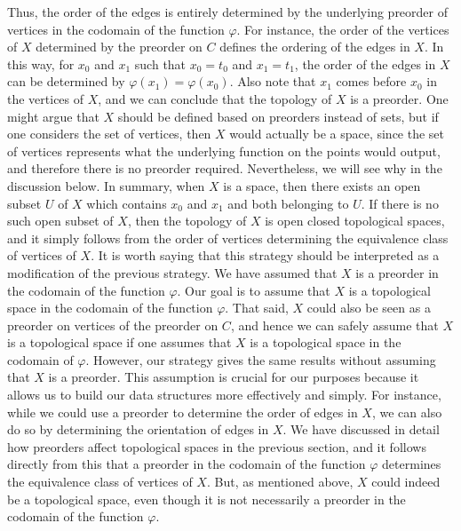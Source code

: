 \documentclass[a4paper,reqno,oneside]{article}
\begin{document}
Thus, the order of the edges is entirely determined by the underlying preorder of vertices in the codomain of the function $\varphi$. For instance, the order of the vertices of $X$ determined by the preorder on $C$ defines the ordering of the edges in $X$. In this way, for $x_0$ and $x_1$ such that $x_0 = t_0$ and $x_1 = t_1$, the order of the edges in $X$ can be determined by $\varphi(x_1) = \varphi(x_0)$. Also note that $x_1$ comes before $x_0$ in the vertices of $X$, and we can conclude that the topology of $X$ is a preorder.
%
One might argue that $X$ should be defined based on preorders instead of sets, but if one considers the set of vertices, then $X$ would actually be a space, since the set of vertices represents what the underlying function on the points would output, and therefore there is no preorder required. Nevertheless, we will see why in the discussion below.  
%
%
In summary, when $X$ is a space, then there exists an open subset $U$ of $X$ which contains $x_0$ and $x_1$ and both belonging to $U$. If there is no such open subset of $X$, then the topology of $X$ is open closed topological spaces, and it simply follows from the order of vertices determining the equivalence class of vertices of $X$.
%
It is worth saying that this strategy should be interpreted as a modification of the previous strategy. We have assumed that $X$ is a preorder in the codomain of the function $\varphi$. Our goal is to assume that $X$ is a topological space in the codomain of the function $\varphi$. That said, $X$ could also be seen as a preorder on vertices of the preorder on $C$, and hence we can safely assume that $X$ is a topological space if one assumes that $X$ is a topological space in the codomain of $\varphi$. However, our strategy gives the same results without assuming that $X$ is a preorder.
%
This assumption is crucial for our purposes because it allows us to build our data structures more effectively and simply. For instance, while we could use a preorder to determine the order of edges in $X$, we can also do so by determining the orientation of edges in $X$. We have discussed in detail how preorders affect topological spaces in the previous section, and it follows directly from this that a preorder in the codomain of the function $\varphi$ determines the equivalence class of vertices of $X$. But, as mentioned above, $X$ could indeed be a topological space, even though it is not necessarily a preorder in the codomain of the function $\varphi$. 
\end{document}
